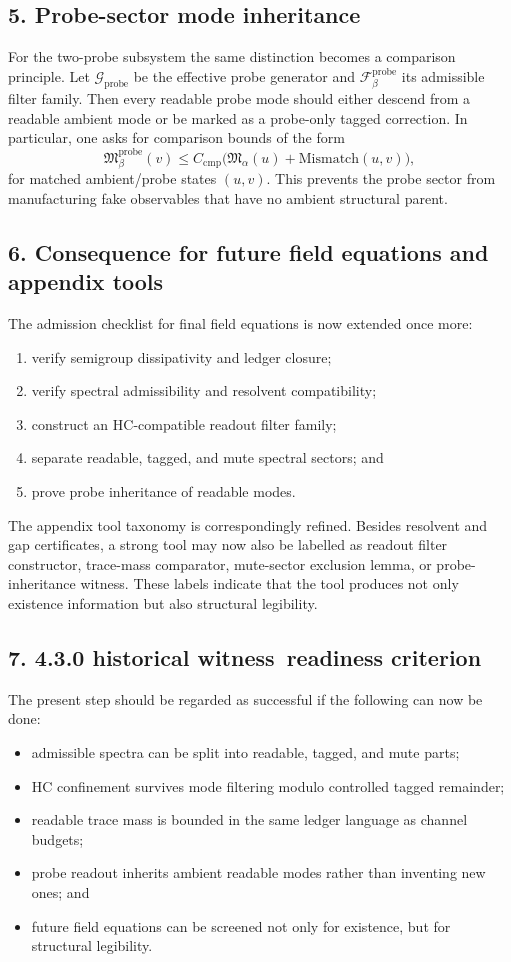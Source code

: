 \documentclass[12pt,a4paper]{article}
\newcommand{\docversion}{4.3.0 historical witness}
\begin{document}
\subsection*{5. Probe-sector mode inheritance}
For the two-probe subsystem the same distinction becomes a comparison principle.
Let $\mathcal G_{\mathrm{probe}}$ be the effective probe generator and
$\mathcal F^{\mathrm{probe}}_\beta$ its admissible filter family. Then every readable
probe mode should either descend from a readable ambient mode or be marked as a
probe-only tagged correction. In particular, one asks for comparison bounds of the
form
\[
\mathfrak M^{\mathrm{probe}}_\beta(v)
\le C_{\mathrm{cmp}}
\bigl( \mathfrak M_\alpha(u) + \mathrm{Mismatch}(u,v) \bigr),
\]
for matched ambient/probe states $(u,v)$. This prevents the probe sector from
manufacturing fake observables that have no ambient structural parent.

\subsection*{6. Consequence for future field equations and appendix tools}
The admission checklist for final field equations is now extended once more:
\begin{enumerate}[label=(\arabic*)]
 \item verify semigroup dissipativity and ledger closure;
 \item verify spectral admissibility and resolvent compatibility;
 \item construct an HC-compatible readout filter family;
 \item separate readable, tagged, and mute spectral sectors; and
 \item prove probe inheritance of readable modes.
\end{enumerate}
The appendix tool taxonomy is correspondingly refined. Besides resolvent and gap
certificates, a strong tool may now also be labelled as readout filter constructor,
trace-mass comparator, mute-sector exclusion lemma, or probe-inheritance witness.
These labels indicate that the tool produces not only existence information but also
structural legibility.

\subsection*{7. \docversion\ readiness criterion}
The present step should be regarded as successful if the following can now be done:
\begin{itemize}
 \item admissible spectra can be split into readable, tagged, and mute parts;
 \item HC confinement survives mode filtering modulo controlled tagged remainder;
 \item readable trace mass is bounded in the same ledger language as channel budgets;
 \item probe readout inherits ambient readable modes rather than inventing new ones; and
 \item future field equations can be screened not only for existence, but for structural legibility.
\end{itemize}
\end{document}
